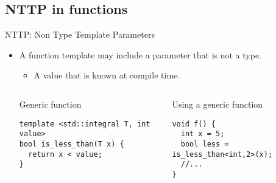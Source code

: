 \subsection{NTTP in functions}

\begin{frame}[t,fragile]{NTTP: Non Type Template Parameters}
\begin{itemize}
  \item A function template may include a parameter that is not
        a type.
    \begin{itemize}
      \item A value that is known at compile time.
    \end{itemize}

\begin{columns}[T]

\begin{block}{Generic function}
\begin{lstlisting}
template <std::integral T, int value>
bool is_less_than(T x) {
  return x < value;
}
\end{lstlisting}
\end{block}

\begin{block}{Using a generic function}
\begin{lstlisting}
void f() {
  int x = 5;
  bool less = is_less_than<int,2>(x);
  //...
}
\end{lstlisting}
\end{block}

\end{columns}

\end{itemize}
\end{frame}

